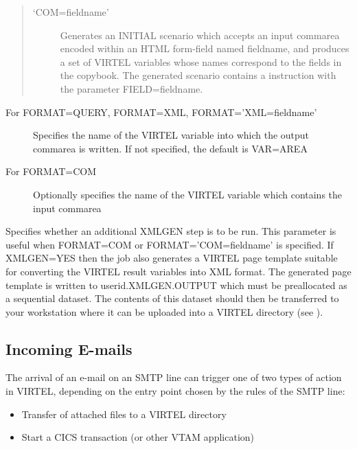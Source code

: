 \documentclass[letterpaper,10pt,english]{sphinxmanual}
\begin{document}
\begin{description}
\begin{quote}
\begin{description}
\item[{‘COM=fieldname’}] \leavevmode
Generates an INITIAL scenario which accepts an input commarea encoded within an HTML form-field named fieldname, and produces a set of VIRTEL variables whose names correspond to the fields in the copybook. The generated scenario contains a {\hyperref[\detokenize{User_Guide:v457ug-map-from-field}]{}} instruction with the parameter FIELD=fieldname.

\end{description}
\end{quote}

\item[{VAR=commareaname}] \leavevmode\begin{description}
\item[{For FORMAT=QUERY, FORMAT=XML, FORMAT=’XML=fieldname’}] \leavevmode
Specifies the name of the VIRTEL variable into which the output commarea is written. If not specified, the default is VAR=AREA

\item[{For FORMAT=COM}] \leavevmode
Optionally specifies the name of the VIRTEL variable which contains the input commarea

\end{description}

\item[{XMLGEN=YES\textbar{}NO}] \leavevmode
Specifies whether an additional XMLGEN step is to be run. This parameter is useful when FORMAT=COM or FORMAT=’COM=fieldname’ is specified. If XMLGEN=YES then the job also generates a VIRTEL page template suitable for converting the VIRTEL result variables into XML format. The generated page template is written to userid.XMLGEN.OUTPUT which must be preallocated as a sequential dataset. The contents of this dataset should then be transferred to your workstation where it can be uploaded into a VIRTEL directory (see {\hyperref[\detokenize{User_Guide:v457ug-http-uploading-pages}]{}}).

\end{description}


\subsection{Incoming E-mails}
\label{\detokenize{User_Guide:incoming-e-mails}}\label{\detokenize{User_Guide:v457ug-email-incoming}}
The arrival of an e-mail on an SMTP line can trigger one of two types of action in VIRTEL, depending on the entry point chosen by the rules of the SMTP line:
\begin{itemize}
\item {} 
Transfer of attached files to a VIRTEL directory

\item {} 
Start a CICS transaction (or other VTAM application)

\end{itemize}
\end{document}
